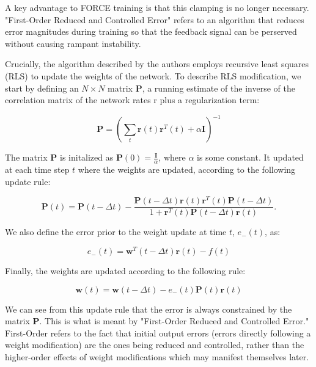 \documentclass{article}
\begin{document}
A key advantage to FORCE training is that this clamping is no longer necessary. "First-Order Reduced and Controlled Error" refers to an algorithm that reduces error magnitudes during training so that the feedback signal can be perserved without causing rampant instability.
\vspace{1em}

Crucially, the algorithm described by the authors employs recursive least squares (RLS) to update the weights of the network. To describe RLS modification, we start by defining an $N \times N$ matrix $\boldsymbol{P}$, a running estimate of the inverse of the correlation matrix of the network rates r plus a regularization term:

\begin{equation}
    \boldsymbol{P} = ( \sum_{t}\boldsymbol{r}(t)\boldsymbol{r}^T(t) + \alpha \boldsymbol{I} )^{-1}
\end{equation}
\vspace{.1em}

The matrix $\boldsymbol{P}$ is initalized as $\boldsymbol{P}(0) = \frac{\boldsymbol{I}}{\alpha}$, where $\alpha$ is some constant. It updated at each time step $t$ where the weights are updated, according to the following update rule:

\begin{equation}
    \mathbf{P}(t) = \mathbf{P}(t - \Delta t) - \frac{\mathbf{P}(t - \Delta t) \mathbf{r}(t) \mathbf{r}^T(t) \mathbf{P}(t - \Delta t)}{1 + \mathbf{r}^T(t) \mathbf{P}(t - \Delta t) \mathbf{r}(t)}.
\end{equation}

\newpage
We also define the error prior to the weight update at time $t$, $e_{-}(t)$, as:

\begin{equation}
    e_{-}(t) = \mathbf{w}^T(t - \Delta t) \mathbf{r}(t) - f(t)
\end{equation}
\vspace{.1em}

Finally, the weights are updated according to the following rule:

\begin{equation}
    \mathbf{w}(t) = \mathbf{w}(t - \Delta t) - e_{-}(t) \mathbf{P}(t) \mathbf{r}(t)
\end{equation}
\vspace{.1em}

We can see from this update rule that the error is always constrained by the matrix $\boldsymbol{P}$. This is what is meant by "First-Order Reduced and Controlled Error." First-Order refers to the fact that initial output errors (errors directly following a weight modification) are the ones being reduced and controlled, rather than the higher-order effects of weight modifications which may manifest themselves later.
\vspace{1em}
\end{document}
